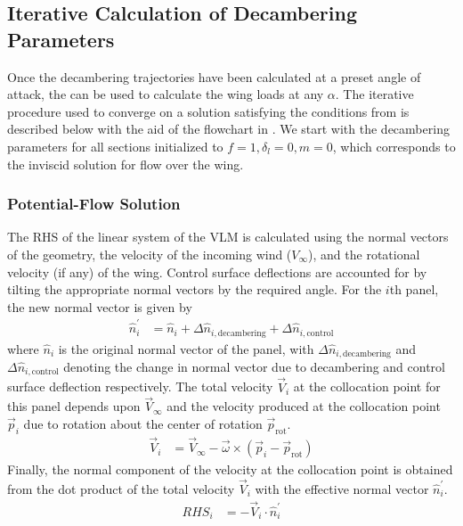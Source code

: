 

\subsection{Iterative Calculation of Decambering Parameters}
\label{sec:iter-nld}
Once the decambering trajectories have been calculated at a preset angle of attack, the \methodname can be used to calculate the wing loads at any $\alpha$. The iterative procedure used to converge on a solution satisfying the conditions from  is described below with the aid of the flowchart in .
We start with the decambering parameters for all sections initialized to $f=1, \delta_l = 0, m = 0$, which corresponds to the inviscid solution for flow over the wing.



\subsubsection{Potential-Flow Solution}\label{step:vlm-solution}
The RHS of the linear system of the VLM is calculated using the normal vectors of the geometry, the velocity of the incoming wind ($V_\infty$), and the rotational velocity (if any) of the wing. Control surface deflections are accounted for by tilting the appropriate normal vectors by the required angle. For the $i$th panel, the new normal vector is given by
\begin{align}
    \hat{n}_{i}^{'} &= \hat{n}_i + \Delta \hat{n}_{i,\text{decambering}} + \Delta\hat{n}_{i,\text{control}}
\end{align}
\noindent where $\hat{n}_i$ is the original normal vector of the panel, with $\Delta \hat{n}_{i,\text{decambering}}$ and  $\Delta\hat{n}_{i,\text{control}}$ denoting the change in normal vector due to decambering and control surface deflection respectively.
The total velocity $\vec{V}_i$ at the collocation point for this panel depends upon $\vec{V}_\infty$ and the velocity produced at the collocation point $\vec{p}_i$ due to rotation about the center of rotation $\vec{p}_\text{rot}$.
\begin{align}
    \vec{V}_i &= \vec{V}_\infty - \vec{\omega} \times (\vec{p}_i - \vec{p}_\text{rot})
\end{align}
Finally, the normal component of the velocity at the collocation point is obtained from the dot product of the total velocity $\vec{V}_i$ with the effective normal vector $\hat{n}_{i}^{'}$.
\begin{align}
    RHS_i &= -\vec{V}_i \cdot \hat{n}_{i}^{'}
\end{align}

